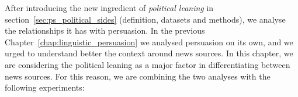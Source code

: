 
After introducing the new ingredient of \emph{political leaning} in section~\ref{sec:ps_political_sides} (definition, datasets and methods), we analyse the relationships it has with persuasion.
In the previous Chapter~\ref{chap:linguistic_persuasion} we analysed persuasion on its own, and we urged to understand better the context around news sources.
In this chapter, we are considering the political leaning as a major factor in differentiating between news sources.
For this reason, we are combining the two analyses with the following experiments:

